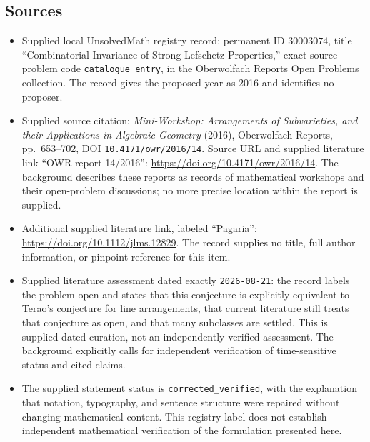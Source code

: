 \documentclass[11pt]{article}
\begin{document}
\subsection{Sources}
\begin{itemize}
\item Supplied local UnsolvedMath registry record: permanent ID \(30003074\), title ``Combinatorial Invariance of Strong Lefschetz Properties,'' exact source problem code \texttt{catalogue entry}, in the Oberwolfach Reports Open Problems collection. The record gives the proposed year as 2016 and identifies no proposer.
\item Supplied source citation: \emph{Mini-Workshop: Arrangements of Subvarieties, and their Applications in Algebraic Geometry} (2016), Oberwolfach Reports, pp.~653--702, DOI \texttt{10.4171/owr/2016/14}. Source URL and supplied literature link ``OWR report 14/2016'': \url{https://doi.org/10.4171/owr/2016/14}. The background describes these reports as records of mathematical workshops and their open-problem discussions; no more precise location within the report is supplied.
\item Additional supplied literature link, labeled ``Pagaria'': \url{https://doi.org/10.1112/jlms.12829}. The record supplies no title, full author information, or pinpoint reference for this item.
\item Supplied literature assessment dated exactly \texttt{2026-08-21}: the record labels the problem open and states that this conjecture is explicitly equivalent to Terao's conjecture for line arrangements, that current literature still treats that conjecture as open, and that many subclasses are settled. This is supplied dated curation, not an independently verified assessment. The background explicitly calls for independent verification of time-sensitive status and cited claims.
\item The supplied statement status is \texttt{corrected\_verified}, with the explanation that notation, typography, and sentence structure were repaired without changing mathematical content. This registry label does not establish independent mathematical verification of the formulation presented here.
\end{itemize}
\end{document}

